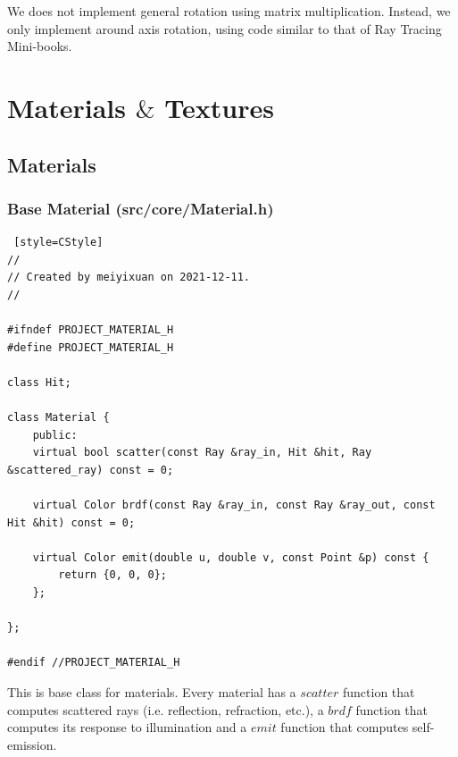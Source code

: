 \documentclass[utf8]{article}
\begin{document}
We does not implement general rotation using matrix multiplication. Instead, we only implement around axis rotation, using code similar to that of Ray Tracing Mini-books.

\section{Materials $\&$ Textures}
\subsection{Materials}
\subsubsection{Base Material (src/core/Material.h)}
\begin{lstlisting} [style=CStyle]
//
// Created by meiyixuan on 2021-12-11.
//

#ifndef PROJECT_MATERIAL_H
#define PROJECT_MATERIAL_H

class Hit;

class Material {
	public:
	virtual bool scatter(const Ray &ray_in, Hit &hit, Ray &scattered_ray) const = 0;
	
	virtual Color brdf(const Ray &ray_in, const Ray &ray_out, const Hit &hit) const = 0;
	
	virtual Color emit(double u, double v, const Point &p) const {
		return {0, 0, 0};
	};
	
};

#endif //PROJECT_MATERIAL_H

\end{lstlisting}
This is base class for materials. Every material has a $scatter$ function that computes scattered rays (i.e. reflection, refraction, etc.), a $brdf$ function that computes its response to illumination and a $emit$ function that computes self-emission.
\end{document}
